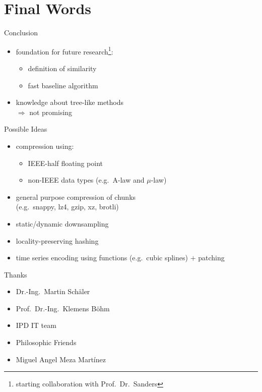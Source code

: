 \documentclass[14pt,t]{beamer}
\begin{document}
\section{Final Words}
\begin{frame}{Conclusion}
    \begin{itemize}
        \item foundation for future research\footnote{starting collaboration with Prof.\ Dr.\ Sanders}:
            \begin{itemize}
                \item definition of similarity
                \item fast baseline algorithm
            \end{itemize}
        \item knowledge about tree-like methods\\$\Rightarrow$ not promising
    \end{itemize}
\end{frame}
\begin{frame}{Possible Ideas}
    \begin{itemize}
        \item compression using:
            \begin{itemize}
                \item IEEE-half floating point
                \item non-IEEE data types (e.g.\ A-law and $\mu$-law)
            \end{itemize}
        \item general purpose compression of chunks\\(e.g.\ snappy, lz4, gzip, xz, brotli)
        \item static/dynamic downsampling
        \item locality-preserving hashing
        \item time series encoding using functions (e.g.\ cubic splines) $+$ patching
    \end{itemize}
\end{frame}

\begin{frame}{Thanks}
    \begin{itemize}
        \item Dr.-Ing.\ Martin Schäler
        \item Prof.\ Dr.-Ing.\ Klemens Böhm
        \item IPD IT team
        \item Philosophic Friends
        \item Miguel Angel Meza Martínez
    \end{itemize}
\end{frame}
\end{document}
